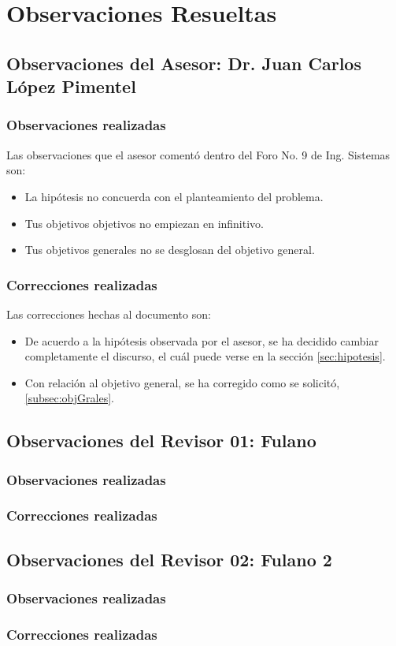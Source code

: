 \chapter{Observaciones Resueltas}


\section{Observaciones del Asesor: Dr. Juan Carlos López Pimentel}

    \subsection{Observaciones realizadas}
    Las observaciones que el asesor comentó dentro del Foro No. 9 de Ing. Sistemas son:
    \begin{itemize}
        \item La hipótesis no concuerda con el planteamiento del problema.
        \item Tus objetivos objetivos no empiezan en infinitivo.
        \item Tus objetivos generales no se desglosan del objetivo general.
    \end{itemize}
    
    \subsection{Correcciones realizadas}
    
    Las correcciones hechas al documento son:
    \begin{itemize}
        \item  De acuerdo a la hipótesis observada por el asesor, se ha decidido cambiar completamente el discurso, el cuál puede verse en la sección \ref{sec:hipotesis}.
        \item Con relación al objetivo general, se ha corregido como se solicitó, \ref{subsec:objGrales}.
    \end{itemize}



\section{Observaciones del Revisor 01: Fulano}

    \subsection{Observaciones realizadas}
    
    \subsection{Correcciones realizadas}



\section{Observaciones del Revisor 02: Fulano 2}

    \subsection{Observaciones realizadas}
    
    \subsection{Correcciones realizadas}
